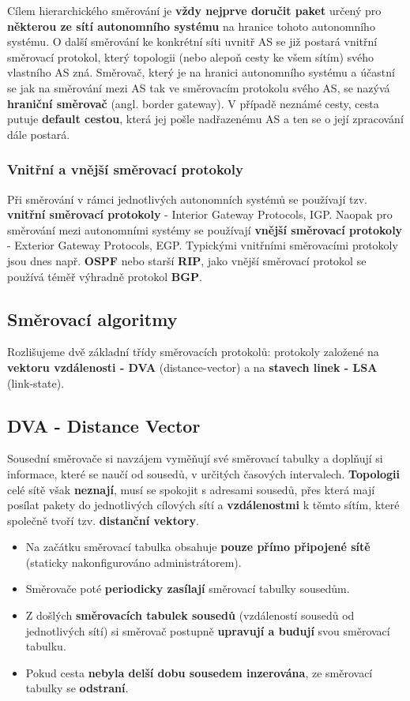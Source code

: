 Cílem hierarchického směrování je \textbf{vždy nejprve doručit paket} určený pro \textbf{některou ze sítí autonomního systému} na hranice tohoto autonomního systému. O další směrování ke konkrétní síti uvnitř AS se již postará vnitřní směrovací protokol, který topologii (nebo alepoň cesty ke všem sítím) svého vlastního AS zná. Směrovač, který je na hranici autonomního systému a účastní se jak na směrování mezi AS tak ve směrovacím protokolu svého AS, se nazývá \textbf{hraniční směrovač} (angl. border gateway). V případě neznámé cesty, cesta putuje \textbf{default cestou}, která jej pošle nadřazenému AS a ten se o její zpracování dále postará.

\subsubsection{Vnitřní a vnější směrovací protokoly}
Při směrování v rámci jednotlivých autonomních systémů se používají tzv. \textbf{vnitřní směrovací protokoly} - Interior Gateway Protocols, IGP. Naopak pro směrování mezi autonomními systémy se používají \textbf{vnější směrovací protokoly} - Exterior Gateway Protocols, EGP. Typickými vnitřními směrovacími protokoly jsou dnes např. \textbf{OSPF} nebo starší \textbf{RIP}, jako vnější směrovací protokol se používá téměř výhradně protokol \textbf{BGP}.

\subsection{Směrovací algoritmy}
Rozlišujeme dvě základní třídy směrovacích protokolů: protokoly založené na \textbf{vektoru vzdálenosti - DVA}  (distance-vector) a na \textbf{stavech linek - LSA} (link-state). 

\subsection{DVA - Distance Vector}
Sousední směrovače si navzájem vyměňují své směrovací tabulky a doplňují si informace, které se naučí od sousedů, v určitých časových intervalech. \textbf{Topologii} celé sítě však \textbf{neznají}, musí se spokojit s adresami sousedů, přes která mají posílat pakety do jednotlivých cílových sítí a \textbf{vzdálenostmi} k těmto sítím, které společně tvoří tzv. \textbf{distanční vektory}.

\begin{itemize}
\item Na začátku směrovací tabulka obsahuje \textbf{pouze přímo připojené sítě} (staticky nakonfigurováno administrátorem).
\item Směrovače poté \textbf{periodicky zasílají }směrovací tabulky sousedům.
\item Z došlých \textbf{směrovacích tabulek sousedů} (vzdáleností sousedů od jednotlivých sítí) si směrovač postupně \textbf{upravují a budují} svou směrovací tabulku.
\item Pokud cesta \textbf{nebyla delší dobu sousedem inzerována}, ze směrovací tabulky se \textbf{odstraní}.
\end{itemize}

